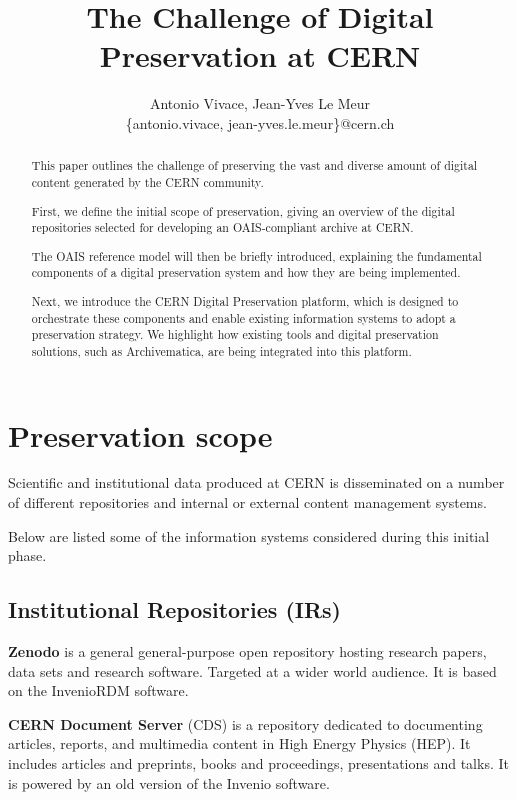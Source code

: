 \documentclass[11pt]{IEEEtran}
\title{ The Challenge of Digital Preservation at CERN }
\author{Antonio Vivace, Jean-Yves Le Meur\\
    \{antonio.vivace, jean-yves.le.meur\}@cern.ch}
\begin{document}
\maketitle

\begin{abstract}
    This paper outlines the challenge of preserving the vast and diverse amount of digital content generated by the CERN community.

    First, we define the initial scope of preservation, giving an overview of the digital repositories selected for developing an OAIS-compliant archive at CERN.

    The OAIS reference model will then be briefly introduced, explaining the fundamental components of a digital preservation system and how they are being implemented.

    Next, we introduce the CERN Digital Preservation platform, which is designed to orchestrate these components and enable existing information systems to adopt a preservation strategy. We highlight how existing tools and digital preservation solutions, such as Archivematica, are being integrated into this platform.

\end{abstract}

\section{Preservation scope}

Scientific and institutional data produced at CERN is disseminated on a number of different repositories and internal or external content management systems.

Below are listed some of the information systems considered during this initial phase.

\subsection{Institutional Repositories (IRs)}

\textbf{Zenodo} is a general general-purpose open repository hosting research papers, data sets and research software. Targeted at a wider world audience. It is based on the InvenioRDM \cite{InvenioRDMinveniosoftwareorg-2023-03-16} software.

\textbf{CERN Document Server} (CDS) is a repository dedicated to documenting articles, reports, and multimedia content in High Energy Physics (HEP). It includes articles and preprints, books and proceedings, presentations and talks. It is powered by an old version of the Invenio software.
\end{document}
